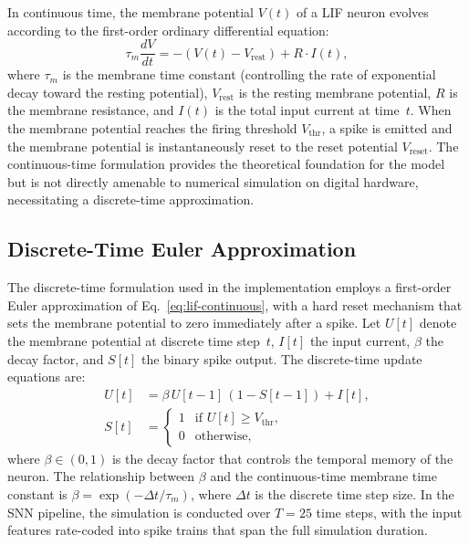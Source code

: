 In continuous time, the membrane potential $V(t)$ of a LIF neuron evolves according to the first-order ordinary differential equation:
\begin{equation}
\tau_m \frac{dV}{dt} = -\left(V(t) - V_{\text{rest}}\right) + R \cdot I(t),
\label{eq:lif-continuous}
\end{equation}
where $\tau_m$ is the membrane time constant (controlling the rate of exponential decay toward the resting potential), $V_{\text{rest}}$ is the resting membrane potential, $R$ is the membrane resistance, and $I(t)$ is the total input current at time~$t$. When the membrane potential reaches the firing threshold $V_{\text{thr}}$, a spike is emitted and the membrane potential is instantaneously reset to the reset potential $V_{\text{reset}}$. The continuous-time formulation provides the theoretical foundation for the model but is not directly amenable to numerical simulation on digital hardware, necessitating a discrete-time approximation.

\subsection{Discrete-Time Euler Approximation}

The discrete-time formulation used in the implementation employs a first-order Euler approximation of Eq.~\eqref{eq:lif-continuous}, with a hard reset mechanism that sets the membrane potential to zero immediately after a spike. Let $U[t]$ denote the membrane potential at discrete time step~$t$, $I[t]$ the input current, $\beta$ the decay factor, and $S[t]$ the binary spike output. The discrete-time update equations are:
\begin{align}
U[t] &= \beta \, U[t-1] \, (1 - S[t-1]) + I[t], \label{eq:lif-discrete-update} \\
S[t] &= \begin{cases} 1 & \text{if } U[t] \geq V_{\text{thr}}, \\ 0 & \text{otherwise,} \end{cases} \label{eq:lif-discrete-spike}
\end{align}
where $\beta \in (0, 1)$ is the decay factor that controls the temporal memory of the neuron. The relationship between $\beta$ and the continuous-time membrane time constant is $\beta = \exp(-\Delta t / \tau_m)$, where $\Delta t$ is the discrete time step size. In the SNN pipeline, the simulation is conducted over $T = 25$ time steps, with the input features rate-coded into spike trains that span the full simulation duration.

